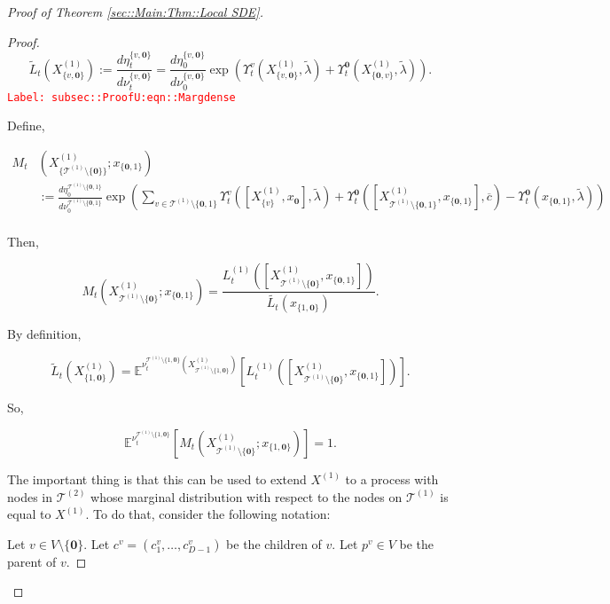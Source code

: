 \documentclass[12pt]{article}
\newcommand{\mb}{\mathbb}
\newcommand{\mc}{\mathcal}
\newcommand{\ov}{\overline}
\newcommand{\tr}{\textcolor{red}}
\newcommand{\labe}[1]{\tr{\texttt{Label: #1}}}
\newcommand{\exmu}[2]{\mb{E}^{#1}\left[#2\right]}	%
\newcommand{\defeq}{:=}								%
\renewcommand{\root}{\mathbf{0}}				%
\renewcommand{\v}{v}							%
\newcommand{\x}{x}								%
\renewcommand{\t}{t}							%
\newcommand{\X}{X}								%
\newcommand{\vind}[1]{^{#1}}					%
\newcommand{\cind}[1]{_{#1}}					%
\newcommand{\ts}[1]{_{#1}}						%
\newcommand{\degr}{D}							%
\newcommand{\IGrg}{\ov{c}}						%
\newcommand{\tree}{\mc{T}}						%
\newcommand{\sln}[1]{^{(#1)}}					%
\newcommand{\alt}[1]{\widetilde{#1}}			%
\newcommand{\mm}{\nu}							%
\newcommand{\mmm}{\eta}							%
\newcommand{\crate}{\alt{\lambda}}				%
\newcommand{\dense}{L}							%
\newcommand{\cdense}{M}							%
\newcommand{\ds}{\Upsilon}						%
\renewcommand{\c}{c}							%
\newcommand{\p}{p}								%
\begin{document}
\begin{proof}[Proof of Theorem \ref{sec::Main:Thm::Local SDE}]
\begin{proof}
\begin{equation}
\alt{\dense}\ts{\t}(\X\sln{1}\cind{\{\v,\root\}}) \defeq \frac{d\mmm\vind{\{\v,\root\}}\ts{\t}}{d\mm\vind{\{\v,\root\}}\ts{\t}} = \frac{d\mmm\vind{\{\v,\root\}}\ts{0}}{d\mm\vind{\{\v,\root\}}\ts{0}}\exp\left(\ds\vind{\v}\ts{\t}(\X\sln{1}\cind{\{\v,\root\}},\crate) + \ds\vind{\root}\ts{\t}(\X\sln{1}\cind{\{\root,\v\}},\crate)\right).
\label{subsec::ProofU:eqn::Margdense}
\end{equation}
\labe{subsec::ProofU:eqn::Margdense}

Define,

\begin{align*}
\cdense\ts{\t}&(\X\sln{1}\cind{\{\tree\sln{1}\setminus\{\root\}\}};\x\cind{\{\root,1\}})\\
& \defeq\frac{d\mmm\vind{\tree\sln{1}\setminus\{\root,1\}}\ts{0}}{d\mm\vind{\tree\sln{1}\setminus\{\root,1\}}\ts{0}}\exp\left(\sum_{\v\in \tree\sln{1}\setminus\{\root,1\}} \ds\vind{\v}\ts{\t}([\X\sln{1}\cind{\{v\}},\x\cind{\root}],\crate) + \ds\vind{\root}\ts{\t}([\X\sln{1}\cind{\tree\sln{1}\setminus\{\root,1\}},\x\cind{\{\root,1\}}],\IGrg) - \ds\vind{\root}\ts{\t}(\x\cind{\{\root,1\}},\crate)\right)\\
\end{align*}

Then,

\[\cdense\ts{\t}(\X\sln{1}\cind{\tree\sln{1}\setminus\{\root\}};\x\cind{\{\root,1\}}) = \frac{\dense\sln{1}\ts{\t}([\X\sln{1}\cind{\tree\sln{1}\setminus\{\root\}},\x\cind{\{\root,1\}}])}{\alt{\dense\ts{\t}}(\x\cind{\{1,\root\}})}.\]

By definition,

\[\alt{\dense}\ts{\t}(\X\sln{1}\cind{\{1,\root\}}) = \exmu{\mm\vind{\tree\sln{1}\setminus\{1,\root\}}\ts{\t}(\X\sln{1}\cind{\tree\sln{1}\setminus\{1,\root\}})}{\dense\sln{1}\ts{\t}([\X\sln{1}\cind{\tree\sln{1}\setminus\{\root\}},\x\cind{\{\root,1\}}])}.\]

So,

\[\exmu{\mm\vind{\tree\sln{1}\setminus\{1,\root\}}\ts{\t}}{\cdense\ts{\t}(\X\sln{1}\cind{\tree\sln{1}\setminus\{\root\}};\x\cind{\{1,\root\}})} = 1.\]

The important thing is that this can be used to extend \(\X\sln{1}\) to a process with nodes in \(\tree\sln{2}\) whose marginal distribution with respect to the nodes on \(\tree\sln{1}\) is equal to \(\X\sln{1}\). To do that, consider the following notation:

Let \(\v \in V\setminus\{\root\}\). Let \(\c\vind{\v} = (\c\cind{1}\vind{\v},\dots,\c\cind{\degr-1}\vind{\v})\) be the children of \(\v\). Let \(\p\vind{\v} \in V\) be the parent of \(\v\).


\end{proof}
\end{proof}
\end{document}
